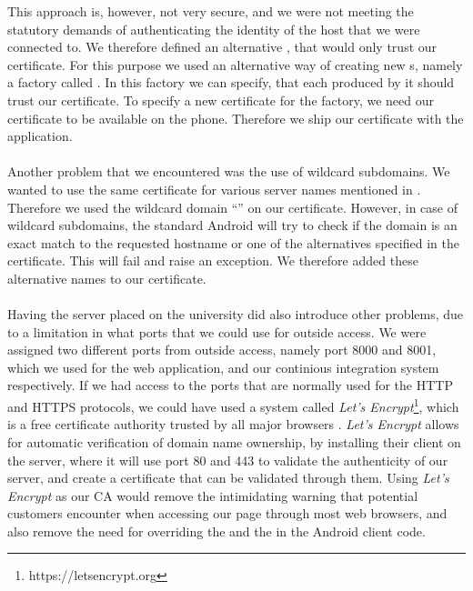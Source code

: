 This approach is, however, not very secure, and we were not meeting the statutory demands of authenticating the identity of the host that we were connected to. We therefore defined an alternative , that would only trust our certificate. For this purpose we used an alternative way of creating new s, namely a factory called . In this factory we can specify, that each  produced by it should trust our certificate. To specify a new certificate for the factory, we need our certificate to be available on the phone. Therefore we ship our certificate with the application. 
\\\\
Another problem that we encountered was the use of wildcard subdomains. We wanted to use the same certificate for various server names mentioned in . Therefore we used the wildcard domain ``'' on our certificate. However, in case of wildcard subdomains, the standard Android  will try to check if the domain is an exact match to the requested hostname or one of the alternatives specified in the certificate. This will fail and raise an exception. We therefore added these alternative names to our certificate.
\\\\
Having the server placed on the university did also introduce other problems, due to a limitation in what ports that we could use for outside access. We were assigned two different ports from outside access, namely port 8000 and 8001, which we used for the web application, and our continious integration system respectively. If we had access to the ports that are normally used for the HTTP and HTTPS protocols, we could have used a system called \emph{Let's Encrypt}\footnote{https://letsencrypt.org}, which is a free certificate authority trusted by all major browsers \parencite{lets_encrypt_all_browsers}. \emph{Let's Encrypt} allows for automatic verification of domain name ownership, by installing their client on the server, where it will use port 80 and 443 to validate the authenticity of our server, and create a certificate that can be validated through them. Using \emph{Let's Encrypt} as our CA would remove the intimidating warning that potential customers encounter when accessing our page through most web browsers, and also remove the need for overriding the  and the  in the Android client code.